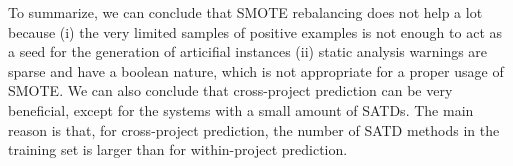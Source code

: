 To summarize, we can conclude that SMOTE rebalancing does not help a lot because (i) the very limited samples of positive examples is not enough to act as a seed for the generation of articifial instances (ii) static analysis warnings are sparse and have a boolean nature, which is not appropriate for a proper usage of SMOTE. We can also conclude that cross-project prediction can be very beneficial, except for the systems with a small amount of SATDs. The main reason is that, for cross-project prediction, the number of SATD methods in the training set is larger than for within-project prediction.

\begin{landscape}
\begin{table*}[t]
	\caption{Top 10 discriminant features (cross-project prediction). (M): source code metrics,  (CS): CheckStyle checks, (P): PMD checks.}
	\label{tab:top10featuresac}
	\centering\scriptsize
	\vspace{-2mm}
\end{table*}
\end{landscape}

